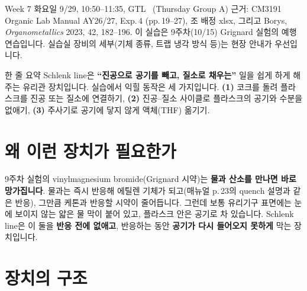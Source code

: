 \documentclass[10pt,a4paper]{article}
\begin{document}
{Week 7 화요일 9/29, 10:50--11:35, GTL \ (Thursday Group A)}
{근거: CM3191 Organic Lab Manual AY26/27, Exp.\,4 (pp.\,19--27), 조 배정 xlsx, 그리고 Borys, \emph{Organometallics} 2023, 42, 182--196. 이 실습은 9주차(10/15) Grignard 실험의 예행연습입니다. 실습실 장비의 세부(기체 종류, 트랩 냉각 방식 등)는 현장 안내가 우선입니다.}

\begin{callout}{한 줄 요약}
Schlenk line은 \textbf{``진공으로 공기를 빼고, 질소로 채우는''} 일을 쉽게 하게 해 주는 유리관 장치입니다. 실습에서 익힐 동작은 세 가지입니다. \textbf{(1)} 코크를 돌려 플라스크를 진공 또는 질소에 연결하기, \textbf{(2)} 진공--질소 사이클로 플라스크의 공기와 수분을 없애기, \textbf{(3)} 주사기로 공기에 닿지 않게 액체(THF) 옮기기.
\end{callout}

\section{왜 이런 장치가 필요한가}
9주차 실험의 vinylmagnesium bromide(Grignard 시약)는 \textbf{물과 산소를 만나면 바로 망가집니다}. 물과는 즉시 반응해 에틸렌 기체가 되고(매뉴얼 p.\,23의 quench 설명과 같은 반응), 그만큼 케톤과 반응할 시약이 줄어듭니다. 그런데 보통 유리기구 표면에는 눈에 보이지 않는 얇은 물 막이 붙어 있고, 플라스크 안은 공기로 차 있습니다. Schlenk line은 이 둘을 \textbf{반응 전에 없애고}, 반응하는 동안 \textbf{공기가 다시 들어오지 못하게} 막는 장치입니다.

\section{장치의 구조}
\end{document}
